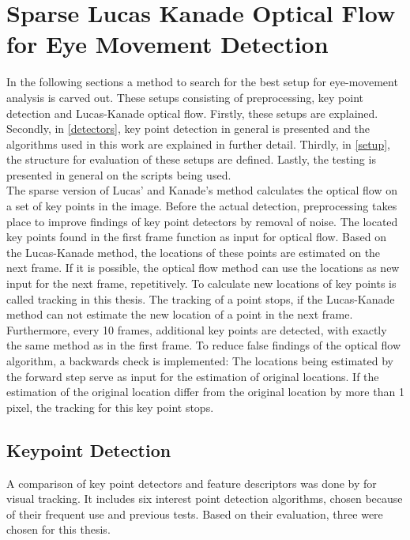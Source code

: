 \documentclass[Bachelorarbeit.tex]{subfiles}
\begin{document}
\newpage
\section{Sparse Lucas Kanade Optical Flow for Eye Movement Detection}
\label{Sparse Lucas Kanade Optical Flow}
In the following sections a method to search for the best setup for eye-movement analysis is carved out. These setups consisting of preprocessing, key point detection and Lucas-Kanade optical flow. Firstly, these setups are explained. Secondly, in \autoref{detectors}, key point detection in general is presented and the algorithms used in this work are explained in further detail. Thirdly, in \autoref{setup}, the structure for evaluation of these setups are defined. Lastly, the testing is presented in general on the scripts being used.\\
The sparse version of Lucas' and Kanade's method calculates the optical flow on a set of key points in the image.  
Before the actual detection, preprocessing takes place to improve findings of key point detectors by removal of noise. The located key points found in the first frame function as input for optical flow. Based on the Lucas-Kanade method, the locations of these points are estimated on the next frame. If it is possible, the optical flow method can use the locations as new input for the next frame, repetitively. To calculate new locations of key points is called tracking in this thesis. The tracking of a point stops, if the Lucas-Kanade method can not estimate the new location of a point in the next frame. Furthermore, every 10 frames, additional key points are detected, with exactly the same method as in the first frame. To reduce false findings of the optical flow algorithm, a backwards check is implemented: The locations being estimated by the forward step serve as input for the estimation of original locations. If the estimation of the original location differ from the original location by more than 1 pixel, the tracking for this key point stops.

\subsection{Keypoint Detection}
\label{detectors}
A comparison of key point detectors and feature descriptors was done by \cite{gauglitz2011evaluation} for visual tracking. It includes six interest point detection algorithms, chosen because of their frequent use and previous tests. Based on their evaluation, three were chosen  for this thesis.
\end{document}
